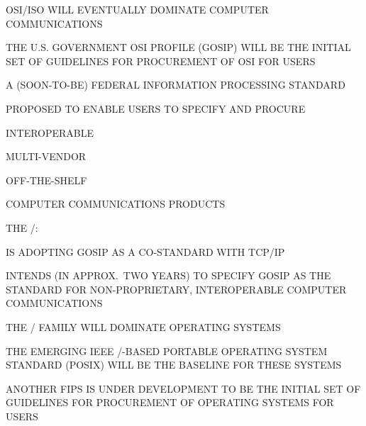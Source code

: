 \begin{bwslide}

\begin{nrtc}
\item	OSI/ISO WILL EVENTUALLY DOMINATE COMPUTER COMMUNICATIONS

\item	THE U.S. GOVERNMENT OSI PROFILE (GOSIP) WILL BE THE INITIAL SET OF
	GUIDELINES FOR PROCUREMENT OF OSI FOR USERS
\end{nrtc}
\end{bwslide}


\begin{bwslide}

\begin{nrtc}
\item	A (SOON-TO-BE) FEDERAL INFORMATION PROCESSING STANDARD

\item	PROPOSED TO ENABLE USERS TO SPECIFY AND PROCURE
	\begin{nrtc}
	\item	INTEROPERABLE

	\item	MULTI-VENDOR

	\item	OFF-THE-SHELF
	\end{nrtc}
	COMPUTER COMMUNICATIONS PRODUCTS

\item	THE \dod/:
    \begin{nrtc}
    \item	IS ADOPTING GOSIP AS A CO-STANDARD WITH TCP/IP

    \item	INTENDS (IN APPROX.~TWO YEARS) TO SPECIFY GOSIP AS THE 
		 STANDARD FOR NON-PROPRIETARY, INTEROPERABLE
		COMPUTER COMMUNICATIONS
    \end{nrtc}
\end{nrtc}
\end{bwslide}


\begin{bwslide}

\begin{nrtc}
\item	THE \unix/ FAMILY WILL DOMINATE OPERATING SYSTEMS

\item	THE EMERGING IEEE \unix/-BASED PORTABLE OPERATING SYSTEM
	STANDARD (POSIX) WILL BE THE BASELINE FOR THESE SYSTEMS

\item	ANOTHER FIPS IS UNDER DEVELOPMENT TO BE THE INITIAL SET OF
	GUIDELINES FOR PROCUREMENT OF OPERATING SYSTEMS FOR USERS
\end{nrtc}
\end{bwslide}


